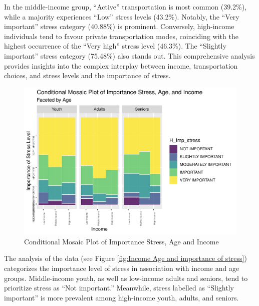 \documentclass[
11pt, %
oneside, %
english, %
singlespacing, %
]{macthesis} %
\begin{document}
In the middle-income group, ``Active'' transportation is most common (39.2\%), while a majority experiences ``Low'' stress levels (43.2\%). Notably, the ``Very important'' stress category (40.88\%) is prominent. Conversely, high-income individuals tend to favour private transportation modes, coinciding with the highest occurrence of the ``Very high'' stress level (46.3\%). The ``Slightly important'' stress category (75.48\%) also stands out. This comprehensive analysis provides insights into the complex interplay between income, transportation choices, and stress levels and the importance of stress.
\begin{figure}
\includegraphics[width=0.85\linewidth]{thesis_files/figure-latex/unnamed-chunk-33-1} \caption{\label{fig:Income Age and importance of stress}Conditional Mosaic Plot of Importance Stress, Age and Income}\label{fig:unnamed-chunk-33}
\end{figure}
The analysis of the data (see Figure \ref{fig:Income Age and importance of stress}) categorizes the importance level of stress in association with income and age groups. Middle-income youth, as well as low-income adults and seniors, tend to prioritize stress as ``Not important.'' Meanwhile, stress labelled as ``Slightly important'' is more prevalent among high-income youth, adults, and seniors.
\end{document}
